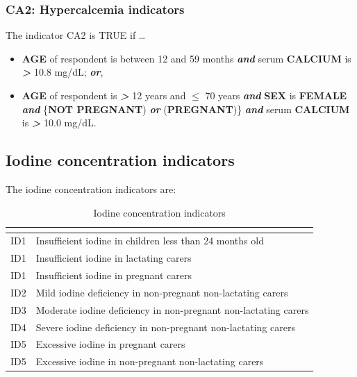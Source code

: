 \documentclass[12pt,a4paper]{article}
\begin{document}
\hypertarget{ca2-hypercalcemia-indicators}{%
\subsubsection{CA2: Hypercalcemia indicators}\label{ca2-hypercalcemia-indicators}}

The indicator CA2 is TRUE if \ldots{}

\begin{itemize}
\item
  \textbf{AGE} of respondent is between 12 and 59 months \textbf{\emph{and}} serum \textbf{CALCIUM} is \textbf{\emph{\textgreater{}}} 10.8 mg/dL; \textbf{\emph{or}},
\item
  \textbf{AGE} of respondent is \textbf{\emph{\textgreater{}}} 12 years and \textbf{\emph{\(\leq\)}} 70 years \textbf{\emph{and}} \textbf{SEX} is \textbf{FEMALE} \textbf{\emph{and}} \{\textbf{NOT PREGNANT}) \textbf{\emph{or}} (\textbf{PREGNANT})\} \textbf{\emph{and}} serum \textbf{CALCIUM} is \textbf{\emph{\textgreater{}}} 10.0 mg/dL.
\end{itemize}

\hypertarget{iodine-concentration-indicators}{%
\subsection{Iodine concentration indicators}\label{iodine-concentration-indicators}}

The iodine concentration indicators are:

\begin{table}[H]

\caption{\label{tab:iodl1}Iodine concentration indicators}
\centering
\begin{tabular}[t]{ll}
\toprule
\textbf{} & \textbf{}\\
\midrule
\rowcolor{gray!6}  ID1 & Insufficient iodine in children less than 24 months old\\
ID1 & Insufficient iodine in lactating carers\\
\rowcolor{gray!6}  ID1 & Insufficient iodine in pregnant carers\\
ID2 & Mild iodine deficiency in non-pregnant non-lactating carers\\
\rowcolor{gray!6}  ID3 & Moderate iodine deficiency in non-pregnant non-lactating carers\\
\addlinespace
ID4 & Severe iodine deficiency in non-pregnant non-lactating carers\\
\rowcolor{gray!6}  ID5 & Excessive iodine in pregnant carers\\
ID5 & Excessive iodine in non-pregnant non-lactating carers\\
\bottomrule
\end{tabular}
\end{table}
\end{document}

